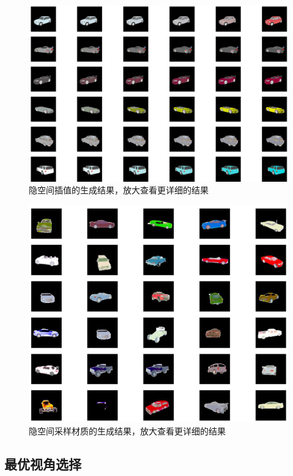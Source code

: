 \documentclass[UTF8,openany,AutoFakeBold,AutoFakeSlant,cs4size]{ctexbook}
\begin{document}
\begin{figure}
\centering
\includegraphics[width=\linewidth]{./images/syn_interpolate_thesis.png}
\caption{隐空间插值的生成结果，放大查看更详细的结果}
\label{result_interpolate}
\end{figure}

\begin{figure}
\centering
\includegraphics[width=\linewidth]{./images/random_SPADE_thesis.png}
\caption{隐空间采样材质的生成结果，放大查看更详细的结果}
\label{fig:sample}
\end{figure}


\subsection{最优视角选择}
\end{document}
